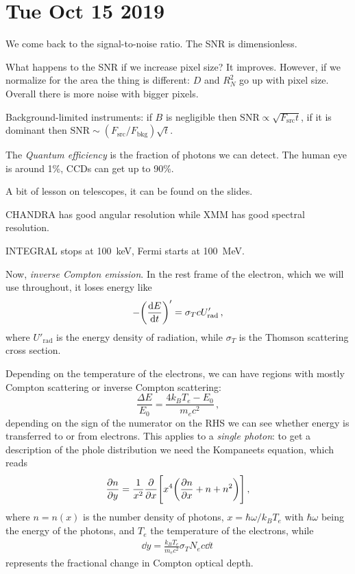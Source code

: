 \documentclass[main.tex]{subfiles}
\begin{document}
\section*{Tue Oct 15 2019}

We come back to the signal-to-noise ratio. 
The SNR is dimensionless.

What happens to the SNR if we increase pixel size?
It improves. However, if we normalize for the area the thing is different: \(D\) and \(R_N^2\) go up with pixel size. Overall there is more noise with bigger pixels.

Background-limited instruments: if \(B\) is negligible then \(\text{SNR} \propto \sqrt{F _{\text{src}} t} \), if it is dominant then \(\text{SNR} \sim (F _{\text{src}}/ F _{\text{bkg}} ) \sqrt{t} \).

The \emph{Quantum efficiency} is the fraction of photons we can detect. The human eye is around 1\%, CCDs can get up to 90\%.

A bit of lesson on telescopes, it can be found on the slides.

CHANDRA has good angular resolution while XMM has good spectral resolution.

INTEGRAL stops at \SI{100}{keV}, Fermi starts at \SI{100}{MeV}.

Now, \emph{inverse Compton emission}.
In the rest frame of the electron, which we will use throughout, it loses energy like 
%
\begin{equation}
  - \qty(\dv{E}{t} )' = \sigma _T c U' _{\text{rad}}
\,,
\end{equation}
%
where \(U' _{\text{rad}}\) is the energy density of radiation,  while \(\sigma _T\) is the Thomson scattering cross section.

Depending on the temperature of the electrons, we can have regions with mostly Compton scattering or inverse Compton scattering: 
%
\begin{equation}
  \frac{\Delta E}{E_0} = \frac{4 k_B T_e - E_0 }{m_e c^2}
\,,
\end{equation}
%
depending on the sign of the numerator on the RHS we can see whether energy is transferred to or from electrons.
This applies to a \emph{single photon}: to get a description of the phole distribution we need the Kompaneets equation, which reads 
%
\begin{align}
\pdv{n}{y} = \frac{1}{x^2} \pdv{}{x} \qty[
x^4 \qty(\pdv{n}{x} + n + n^2)
]
\,,
\end{align}
%
where \(n = n(x)\) is the number density of photons, \(x = \hbar \omega / k_B T_e\) with \(\hbar\omega \) being the energy of the photons, and \(T_e\) the temperature of the electrons, while 
%
\begin{align}
\dd{y} = \frac{k_B T_e}{m_e c^2} \sigma_T N_e c \dd{t}
\,
\end{align}
%
represents the fractional change in Compton optical depth.
\end{document}
